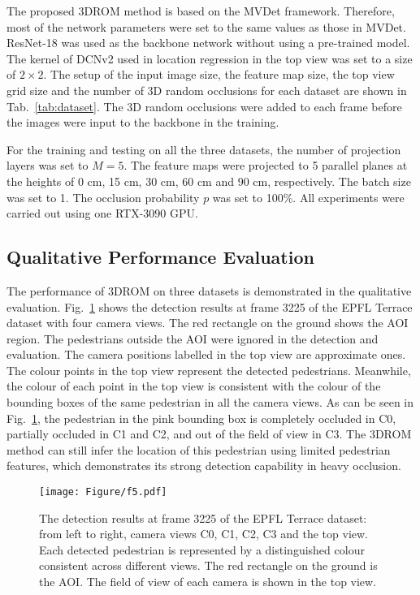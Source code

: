 \documentclass[runningheads]{llncs}
\begin{document}
	
	The proposed 3DROM method is based on the MVDet framework. Therefore, most of the network parameters were set to the same values as those in MVDet. ResNet-18 was used as the backbone network without using a pre-trained model. The kernel of DCNv2 used in location regression in the top view was set to a size of $2\times2$. The setup of the input image size, the feature map size, the top view grid size and the number of 3D random occlusions for each dataset are shown in Tab.~\ref{tab:dataset}. The 3D random occlusions were added to each frame before the images were input to the backbone in the training.
	
	
	For the training and testing on all the three datasets, the number of projection layers was set to $M=5$. The feature maps were projected to 5 parallel planes at the heights of 0 cm, 15 cm, 30 cm, 60 cm and 90 cm, respectively. The batch size was set to 1. The occlusion probability $p$ was set to 100\%. All experiments were carried out using one RTX-3090 GPU.


	
	
	\subsection{Qualitative Performance Evaluation}
	The performance of 3DROM on three datasets is demonstrated in the qualitative evaluation. Fig.~\ref{f5} shows the detection results at frame 3225 of the EPFL Terrace dataset with four camera views. The red rectangle on the ground shows the AOI region. The pedestrians outside the AOI were ignored in the detection and evaluation. The camera positions labelled in the top view are approximate ones. The colour points in the top view represent the detected pedestrians. Meanwhile, the colour of each point in the top view is consistent with the colour of the bounding boxes of the same pedestrian in all the camera views. As can be seen in Fig.~\ref{f5}, the pedestrian in the pink bounding box is completely occluded in C0, partially occluded in C1 and C2, and out of the field of view in C3. The 3DROM method can still infer the location of this pedestrian using limited pedestrian features, which demonstrates its strong detection capability in heavy occlusion.
	\begin{figure}
		\centering
		\texttt{[image: Figure/f5.pdf]}
\caption{The detection results at frame 3225 of the EPFL Terrace dataset: from left to right, camera views C0, C1, C2, C3 and the top view. Each detected pedestrian is represented by a distinguished colour consistent across different views. The red rectangle on the ground is the AOI. The field of view of each camera is shown in the top view.
		}
		\label{f5}
	\end{figure}
	
\end{document}
